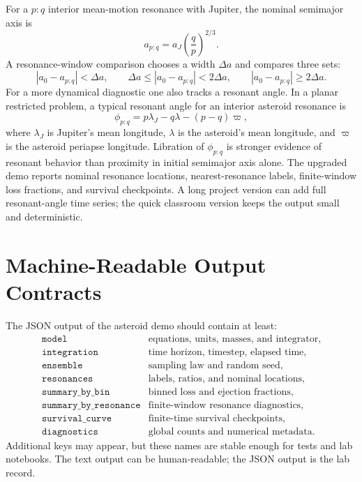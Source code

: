 For a \(p:q\) interior mean-motion resonance with Jupiter, the nominal
semimajor axis is
\[
        a_{p:q}=a_J\left(\frac{q}{p}\right)^{2/3}.
\]
A resonance-window comparison chooses a width \(\Delta a\) and compares three
sets:
\[
        |a_0-a_{p:q}|<\Delta a,\qquad
        \Delta a\le |a_0-a_{p:q}|<2\Delta a,\qquad
        |a_0-a_{p:q}|\ge 2\Delta a .
\]
For a more dynamical diagnostic one also tracks a resonant angle.  In a planar
restricted problem, a typical resonant angle for an interior asteroid
resonance is
\[
        \phi_{p:q}=p\lambda_J-q\lambda-(p-q)\varpi ,
\]
where \(\lambda_J\) is Jupiter's mean longitude, \(\lambda\) is the asteroid's
mean longitude, and \(\varpi\) is the asteroid periapse longitude.  Libration
of \(\phi_{p:q}\) is stronger evidence of resonant behavior than proximity in
initial semimajor axis alone.  The upgraded demo reports nominal resonance
locations, nearest-resonance labels, finite-window loss fractions, and survival
checkpoints.  A long project version can add full resonant-angle time series;
the quick classroom version keeps the output small and deterministic.

\section{Machine-Readable Output Contracts}
\label{sec:three-body-output-contracts}

The JSON output of the asteroid demo should contain at least:
\[
\begin{array}{ll}
\texttt{model} & \text{equations, units, masses, and integrator},\\
\texttt{integration} & \text{time horizon, timestep, elapsed time},\\
\texttt{ensemble} & \text{sampling law and random seed},\\
\texttt{resonances} & \text{labels, ratios, and nominal locations},\\
\texttt{summary\_by\_bin} & \text{binned loss and ejection fractions},\\
\texttt{summary\_by\_resonance} & \text{finite-window resonance diagnostics},\\
\texttt{survival\_curve} & \text{finite-time survival checkpoints},\\
\texttt{diagnostics} & \text{global counts and numerical metadata}.
\end{array}
\]
Additional keys may appear, but these names are stable enough for tests and lab
notebooks.  The text output can be human-readable; the JSON output is the lab
record.

